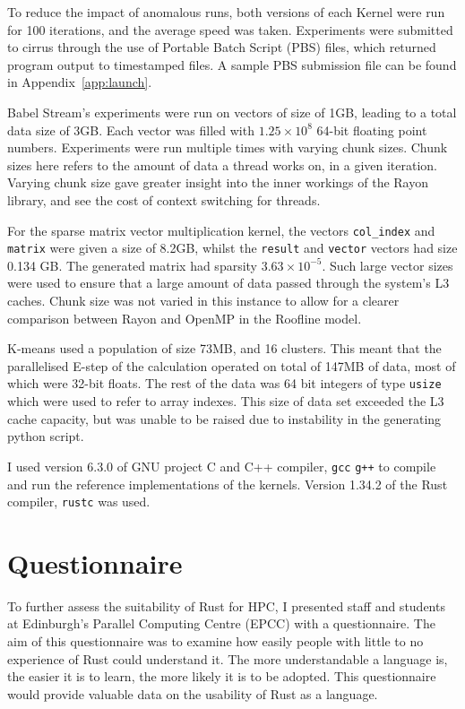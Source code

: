 To reduce the impact of anomalous runs, both versions of each Kernel were run for 100 iterations, and the average speed was taken. Experiments were submitted to cirrus through the use of Portable Batch Script (PBS) files, which returned program output to timestamped files. A sample PBS submission file can be found in Appendix~\ref{app:launch}.

Babel Stream's experiments were run on vectors of size of 1GB, leading to a total data size of 3GB. Each vector was filled with $1.25\times10^8$ 64-bit floating point numbers. Experiments were run multiple times with varying chunk sizes. Chunk sizes here refers to the amount of data a thread works on, in a given iteration. Varying chunk size gave greater insight into the inner workings of the Rayon library, and see the cost of context switching for threads.

For the sparse matrix vector multiplication kernel, the vectors \texttt{col\_index} and \texttt{matrix} were given a size of 8.2GB, whilst the \texttt{result} and \texttt{vector} vectors had size 0.134 GB. The generated matrix had sparsity $3.63 \times 10^{-5}$. Such large vector sizes were used to ensure that a large amount of data passed through the system's L3 caches. Chunk size was not varied in this instance to allow for a clearer comparison between Rayon and OpenMP in the Roofline model.

K-means used a population of size 73MB, and 16 clusters. This meant that the parallelised E-step of the calculation operated on total of 147MB of data, most of which were 32-bit floats. The rest of the data was 64 bit integers of type \texttt{usize} which were used to refer to array indexes. This size of data set exceeded the L3 cache capacity, but was unable to be raised due to instability in the generating python script.

I used version 6.3.0 of GNU project C  and C++ compiler, \texttt{gcc} \texttt{g++} to compile and run the reference implementations of the kernels. Version 1.34.2 of the Rust compiler, \texttt{rustc} was used.
\section{Questionnaire}
To further assess the suitability of Rust for HPC, I presented staff and students at Edinburgh's Parallel Computing Centre (EPCC) with a questionnaire. The aim of this questionnaire was to examine how easily people with little to no experience of Rust could understand it. The more understandable a language is, the easier it is to learn, the more likely it is to be adopted. This questionnaire would provide valuable data on the usability of Rust as a language.

